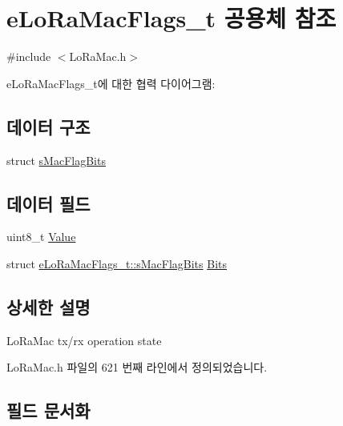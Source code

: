 \hypertarget{unione_lo_ra_mac_flags__t}{}\section{e\+Lo\+Ra\+Mac\+Flags\+\_\+t 공용체 참조}
\label{unione_lo_ra_mac_flags__t}


{\ttfamily \#include $<$Lo\+Ra\+Mac.\+h$>$}



e\+Lo\+Ra\+Mac\+Flags\+\_\+t에 대한 협력 다이어그램\+:
\subsection*{데이터 구조}
\begin{DoxyCompactItemize}
\item 
struct \mbox{\hyperlink{structe_lo_ra_mac_flags__t_1_1s_mac_flag_bits}{s\+Mac\+Flag\+Bits}}
\end{DoxyCompactItemize}
\subsection*{데이터 필드}
\begin{DoxyCompactItemize}
\item 
uint8\+\_\+t \mbox{\hyperlink{unione_lo_ra_mac_flags__t_a88f4d00bdab99ae6f48c7ae0bc468bb4}{Value}}
\item 
struct \mbox{\hyperlink{structe_lo_ra_mac_flags__t_1_1s_mac_flag_bits}{e\+Lo\+Ra\+Mac\+Flags\+\_\+t\+::s\+Mac\+Flag\+Bits}} \mbox{\hyperlink{unione_lo_ra_mac_flags__t_aaed1c36f988521e76eaa81554e1e8e96}{Bits}}
\end{DoxyCompactItemize}


\subsection{상세한 설명}
Lo\+Ra\+Mac tx/rx operation state 

Lo\+Ra\+Mac.\+h 파일의 621 번째 라인에서 정의되었습니다.



\subsection{필드 문서화}
\mbox{\label{unione_lo_ra_mac_flags__t_aaed1c36f988521e76eaa81554e1e8e96}} 
